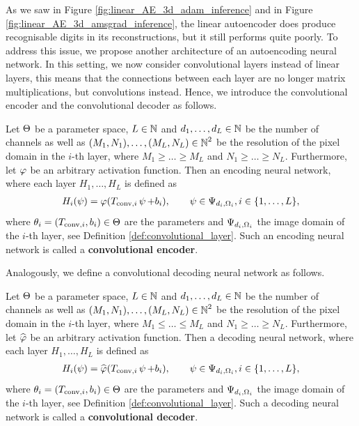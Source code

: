 As we saw in Figure \ref{fig:linear_AE_3d_adam_inference} and in Figure \ref{fig:linear_AE_3d_amsgrad_inference}, the linear autoencoder does produce recognisable digits in its reconstructions, but it still performs quite poorly. To address this issue, we propose another architecture of an autoencoding neural network. In this setting, we now consider convolutional layers instead of linear layers, this means that the connections between each layer are no longer matrix multiplications, but convolutions instead. Hence, we introduce the convolutional encoder and the convolutional decoder as follows.


\begin{definition}\label{def_convolutional_encoder}
Let $\operatorname{\Theta}$ be a parameter space, $L\in \operatorname{\mathbb{N}}$ and $d_1,\ldots, d_L\in\operatorname{\mathbb{N}}$ be the number of channels as well as $(M_1,N_1),\ldots,(M_L,N_L) \in \operatorname{\mathbb{N}}^2$ be the resolution of the pixel domain in the $i$-th layer, where $M_1\geq \ldots \geq M_L$ and $N_1\geq \ldots \geq N_L$. Furthermore, let $\operatorname{\varphi}$ be an arbitrary activation function. Then an encoding neural network, where each layer $H_1,\ldots, H_L$ is defined as
\begin{align*}
H_i(\operatorname{\psi}) = \operatorname{\varphi}(T_{\text{conv}, i}\operatorname{\psi} + b_i), \qquad \operatorname{\psi} \in \Psi_{d_i,\Omega_i}, i \in \{1,\ldots, L\},
\end{align*}
where $\theta_i = (T_{\text{conv}, i}, b_i)\in\operatorname{\Theta}$ are the parameters and $\Psi_{d_i,\Omega_i}$ the image domain of the $i$-th layer, see Definition \ref{def:convolutional_layer}. Such an encoding neural network is called a \textbf{convolutional encoder}.
\end{definition}

Analogously, we define a convolutional decoding neural network as follows.

\begin{definition}\label{def_convolutional_decoder}
Let $\operatorname{\Theta}$ be a parameter space, $L\in \operatorname{\mathbb{N}}$ and $d_1,\ldots, d_L\in\operatorname{\mathbb{N}}$ be the number of channels as well as $(M_1,N_1),\ldots,(M_L,N_L) \in \operatorname{\mathbb{N}}^2$ be the resolution of the pixel domain in the $i$-th layer, where $M_1\leq \ldots \leq M_L$ and $N_1\geq \ldots \geq N_L$. Furthermore, let $\widehat{\operatorname{\varphi}}$ be an arbitrary activation function. Then a decoding neural network, where each layer $H_1,\ldots, H_L$ is defined as
\begin{align*}
H_i(\operatorname{\psi}) = \widehat{\operatorname{\varphi}}(T_{\text{conv}, i}\operatorname{\psi} + b_i), \qquad \operatorname{\psi} \in \Psi_{d_i,\Omega_i}, i \in \{1,\ldots, L\},
\end{align*}
where $\theta_i = (T_{\text{conv}, i}, b_i)\in\operatorname{\Theta}$ are the parameters and $\Psi_{d_i,\Omega_i}$ the image domain of the $i$-th layer, see Definition \ref{def:convolutional_layer}. Such a decoding neural network is called a \textbf{convolutional decoder}.
\end{definition}

